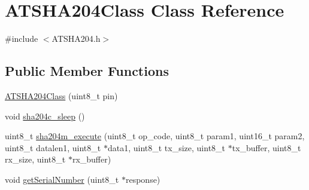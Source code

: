 \hypertarget{classATSHA204Class}{}\section{A\+T\+S\+H\+A204\+Class Class Reference}
\label{classATSHA204Class}


{\ttfamily \#include $<$A\+T\+S\+H\+A204.\+h$>$}

\subsection*{Public Member Functions}
\begin{DoxyCompactItemize}
\item 
\hyperlink{classATSHA204Class_ac2d1196f44961ce709be1f8bf59c162b}{A\+T\+S\+H\+A204\+Class} (uint8\+\_\+t pin)
\item 
void \hyperlink{classATSHA204Class_ac51be7c43d75dcc439d89ecb0493149b}{sha204c\+\_\+sleep} ()
\item 
uint8\+\_\+t \hyperlink{classATSHA204Class_a8600d67f5c574e1584ef5555429f305b}{sha204m\+\_\+execute} (uint8\+\_\+t op\+\_\+code, uint8\+\_\+t param1, uint16\+\_\+t param2, uint8\+\_\+t datalen1, uint8\+\_\+t $\ast$data1, uint8\+\_\+t tx\+\_\+size, uint8\+\_\+t $\ast$tx\+\_\+buffer, uint8\+\_\+t rx\+\_\+size, uint8\+\_\+t $\ast$rx\+\_\+buffer)
\item 
void \hyperlink{classATSHA204Class_ade50092ec236d13cde64e7684b59ab7b}{get\+Serial\+Number} (uint8\+\_\+t $\ast$response)
\end{DoxyCompactItemize}
